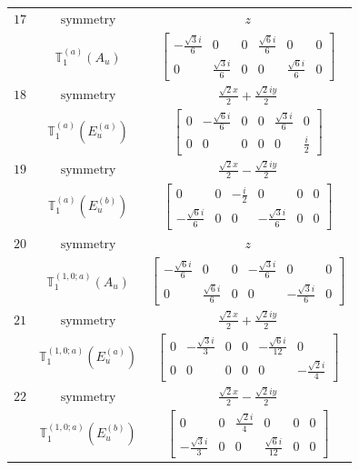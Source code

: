 \documentclass[fleqn,8pt,landscape]{jsarticle}
\begin{document}
\begin{longtable}{ccc}
$ 17 $ & $ \text{symmetry} $ & $ z $ \\
$  $ & $ \mathbb{T}_{1}^{(a)}(A_{u}) $ & $ \begin{bmatrix} - \frac{\sqrt{3} i}{6} & 0 & 0 & \frac{\sqrt{6} i}{6} & 0 & 0 \\ 0 & \frac{\sqrt{3} i}{6} & 0 & 0 & \frac{\sqrt{6} i}{6} & 0 \end{bmatrix} $ \\ \hline
$ 18 $ & $ \text{symmetry} $ & $ \frac{\sqrt{2} x}{2} + \frac{\sqrt{2} i y}{2} $ \\
$  $ & $ \mathbb{T}_{1}^{(a)}(E_{u}^{(a)}) $ & $ \begin{bmatrix} 0 & - \frac{\sqrt{6} i}{6} & 0 & 0 & \frac{\sqrt{3} i}{6} & 0 \\ 0 & 0 & 0 & 0 & 0 & \frac{i}{2} \end{bmatrix} $ \\ \hline
$ 19 $ & $ \text{symmetry} $ & $ \frac{\sqrt{2} x}{2} - \frac{\sqrt{2} i y}{2} $ \\
$  $ & $ \mathbb{T}_{1}^{(a)}(E_{u}^{(b)}) $ & $ \begin{bmatrix} 0 & 0 & - \frac{i}{2} & 0 & 0 & 0 \\ - \frac{\sqrt{6} i}{6} & 0 & 0 & - \frac{\sqrt{3} i}{6} & 0 & 0 \end{bmatrix} $ \\ \hline
$ 20 $ & $ \text{symmetry} $ & $ z $ \\
$  $ & $ \mathbb{T}_{1}^{(1,0;a)}(A_{u}) $ & $ \begin{bmatrix} - \frac{\sqrt{6} i}{6} & 0 & 0 & - \frac{\sqrt{3} i}{6} & 0 & 0 \\ 0 & \frac{\sqrt{6} i}{6} & 0 & 0 & - \frac{\sqrt{3} i}{6} & 0 \end{bmatrix} $ \\ \hline
$ 21 $ & $ \text{symmetry} $ & $ \frac{\sqrt{2} x}{2} + \frac{\sqrt{2} i y}{2} $ \\
$  $ & $ \mathbb{T}_{1}^{(1,0;a)}(E_{u}^{(a)}) $ & $ \begin{bmatrix} 0 & - \frac{\sqrt{3} i}{3} & 0 & 0 & - \frac{\sqrt{6} i}{12} & 0 \\ 0 & 0 & 0 & 0 & 0 & - \frac{\sqrt{2} i}{4} \end{bmatrix} $ \\ \hline
$ 22 $ & $ \text{symmetry} $ & $ \frac{\sqrt{2} x}{2} - \frac{\sqrt{2} i y}{2} $ \\
$  $ & $ \mathbb{T}_{1}^{(1,0;a)}(E_{u}^{(b)}) $ & $ \begin{bmatrix} 0 & 0 & \frac{\sqrt{2} i}{4} & 0 & 0 & 0 \\ - \frac{\sqrt{3} i}{3} & 0 & 0 & \frac{\sqrt{6} i}{12} & 0 & 0 \end{bmatrix} $ \\ \hline

\end{longtable}
\end{document}
